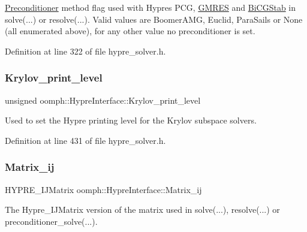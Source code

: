 \hyperlink{classoomph_1_1Preconditioner}{Preconditioner} method flag used with Hypre\textquotesingle{}s P\+CG, \hyperlink{classoomph_1_1GMRES}{G\+M\+R\+ES} and \hyperlink{classoomph_1_1BiCGStab}{Bi\+C\+G\+Stab} in solve(...) or resolve(...). Valid values are Boomer\+A\+MG, Euclid, Para\+Sails or None (all enumerated above), for any other value no preconditioner is set. 



Definition at line 322 of file hypre\+\_\+solver.\+h.

\mbox{\label{classoomph_1_1HypreInterface_a901fbdfa98992faf1cdae4d2d1ac9a2b}} 
\subsubsection{\texorpdfstring{Krylov\+\_\+print\+\_\+level}{Krylov\_print\_level}}
{\footnotesize\ttfamily unsigned oomph\+::\+Hypre\+Interface\+::\+Krylov\+\_\+print\+\_\+level\hspace{0.3cm}{\ttfamily [protected]}}



Used to set the Hypre printing level for the Krylov subspace solvers. 



Definition at line 431 of file hypre\+\_\+solver.\+h.

\mbox{\label{classoomph_1_1HypreInterface_ad94c5a5a5191a786ce63e4d2c0d4c65d}} 
\subsubsection{\texorpdfstring{Matrix\+\_\+ij}{Matrix\_ij}}
{\footnotesize\ttfamily H\+Y\+P\+R\+E\+\_\+\+I\+J\+Matrix oomph\+::\+Hypre\+Interface\+::\+Matrix\+\_\+ij\hspace{0.3cm}{\ttfamily [private]}}



The Hypre\+\_\+\+I\+J\+Matrix version of the matrix used in solve(...), resolve(...) or preconditioner\+\_\+solve(...). 



